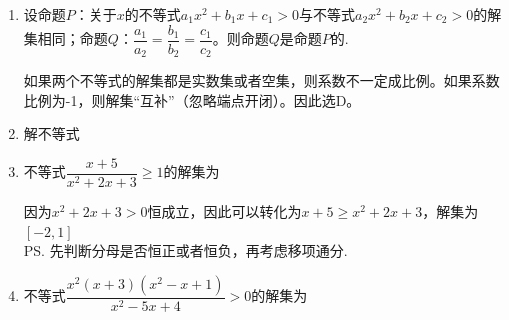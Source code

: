 \begin{enumerate}
\begin{enumerate}
        \item 设命题$P$：关于$x$的不等式$a_1x^2+b_1x+c_1 > 0$与不等式$a_2x^2+b_2x+c_2 > 0$的解集相同；命题$Q$：$\dfrac{a_1}{a_2} = \dfrac{b_1}{b_2} = \dfrac{c_1}{c_2}$。则命题$Q$是命题$P$的.
        \begin{jieda}
            如果两个不等式的解集都是实数集或者空集，则系数不一定成比例。如果系数比例为-1，则解集“互补”（忽略端点开闭）。因此选D。
        \end{jieda}
        \item 解不等式
        \begin{jieda}        
        \end{jieda}
        \item 不等式$\dfrac{x+5}{x^2+2x+3} \geq 1$的解集为\blkda{$[-2, 1]$}
        \begin{jieda}
            因为$x^2+2x+3 > 0$恒成立，因此可以转化为$x+5 \geq x^2+2x+3$，解集为$[-2, 1]$ \\
            \ps 先判断分母是否恒正或者恒负，再考虑移项通分.
        \end{jieda}
        \item 不等式$\dfrac{x^2(x+3)(x^2-x+1)}{x^2 - 5x + 4} > 0$的解集为

\end{enumerate}
\end{enumerate}

